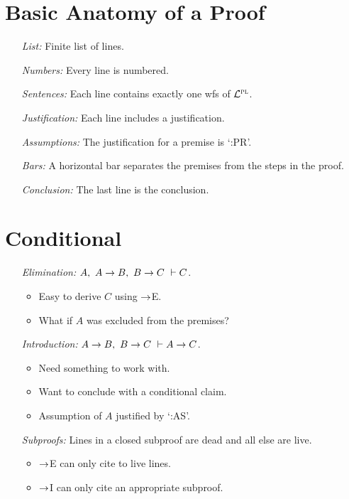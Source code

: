 \documentclass[a4paper, 11pt]{article} %
\begin{document}
\section*{Basic Anatomy of a Proof}

\begin{enumerate}
  \item[\it List:] Finite list of lines.
  \item[\it Numbers:] Every line is numbered. 
  \item[\it Sentences:] Each line contains exactly one wfs of $\mathcal{L}^{\textsc{pl}}$. 
  \item[\it Justification:] Each line includes a justification.
  \item[\it Assumptions:] The justification for a premise is `:PR'.
  \item[\it Bars:] A horizontal bar separates the premises from the steps in the proof.
  \item[\it Conclusion:] The last line is the conclusion. 
\end{enumerate}


\section*{Conditional}

\begin{enumerate}
  \item[\it Elimination:] $A,\ A \rightarrow B,\ B \rightarrow C\ \vdash C$. 
    \begin{itemize}
      \item Easy to derive $C$ using $\rightarrow$E.
      \item What if $A$ was excluded from the premises? 
    \end{itemize}
  \item[\it Introduction:] $A \rightarrow B,\ B \rightarrow C\ \vdash A \rightarrow C$. 
    \begin{itemize}
      \item Need something to work with.
      \item Want to conclude with a conditional claim.
      \item Assumption of $A$ justified by `:AS'.
    \end{itemize}
  \item[\it Subproofs:] Lines in a closed subproof are dead and all else are live.
    \begin{itemize}
      \item $\rightarrow$E can only cite to live lines.
      \item $\rightarrow$I can only cite an appropriate subproof.
    \end{itemize}
\end{enumerate}
\end{document}
